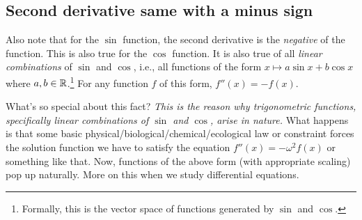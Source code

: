 \documentclass[10pt]{amsart}
\begin{document}
\subsection{Second derivative same with a minus sign}

Also note that for the $\sin$ function, the second derivative is the
{\em negative} of the function. This is also true for the $\cos$
function. It is also true of all {\em linear combinations} of $\sin$
and $\cos$, i.e., all functions of the form $x \mapsto a \sin x + b
\cos x$ where $a, b \in \mathbb{R}$.\footnote{Formally, this is the vector
space of functions generated by $\sin$ and $\cos$.} For any function
$f$ of this form, $f''(x) = -f(x)$.

What's so special about this fact? {\em This is the reason why
trigonometric functions, specifically linear combinations of $\sin$
and $\cos$, arise in nature.} What happens is that some basic
physical/biological/chemical/ecological law or constraint forces the
solution function we have to satisfy the equation $f''(x) =
-\omega^2f(x)$ or something like that. Now, functions of the above
form (with appropriate scaling) pop up naturally. More on this when we
study differential equations.
\end{document}
